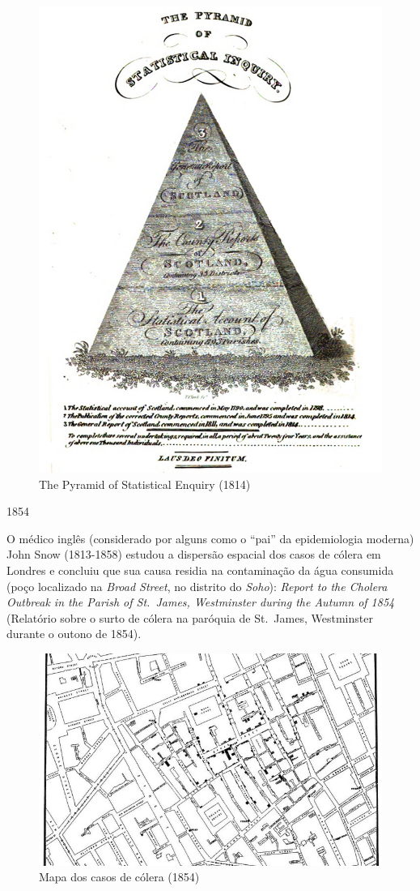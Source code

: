 \documentclass[
]{book}
\theoremstyle{definition}
\theoremstyle{definition}
\theoremstyle{definition}
\theoremstyle{definition}
\theoremstyle{remark}
\begin{document}
\begin{figure}

{\centering \includegraphics[width=0.5\linewidth]{images/sinclair} 

}

\caption{The Pyramid of Statistical Enquiry  (1814)}\label{fig:unnamed-chunk-8}
\end{figure}

1854

O médico inglês (considerado por alguns como o ``pai'' da epidemiologia moderna) John Snow (1813-1858) estudou a dispersão espacial dos casos de cólera em Londres e concluiu que sua causa residia na contaminação da água consumida (poço localizado na \emph{Broad Street}, no distrito do \emph{Soho}): \emph{Report to the Cholera Outbreak in the Parish of St.~James, Westminster during the Autumn of 1854} (Relatório sobre o surto de cólera na paróquia de St.~James, Westminster durante o outono de 1854).

\begin{figure}

{\centering \includegraphics[width=0.5\linewidth]{images/london-1854-snow} 

}

\caption{Mapa dos casos de cólera (1854)}\label{fig:unnamed-chunk-9}
\end{figure}
\end{document}
